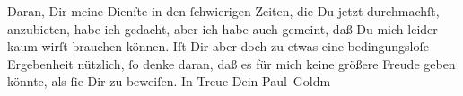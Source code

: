            \pstart
           Daran, Dir meine Dienſte in den ſchwierigen Zeiten, die Du jetzt durchmachſt,
               anzubieten, habe ich \strikeout{\textcolor{gray}{×}} gedacht, aber ich habe  auch gemeint, daß
               Du mich leider kaum wirſt brauchen können. Iſt Dir aber doch zu etwas eine
               bedingungsloſe Ergebenheit nützlich, ſo denke daran, daß es für mich keine größere
               Freude geben könnte, als ſie Dir zu beweiſen.\pend
           \pstart In Treue Dein \spacefill\mbox{Paul Goldm}\pend{}\endnumbering{}\begin{anhang}\end{anhang}
      